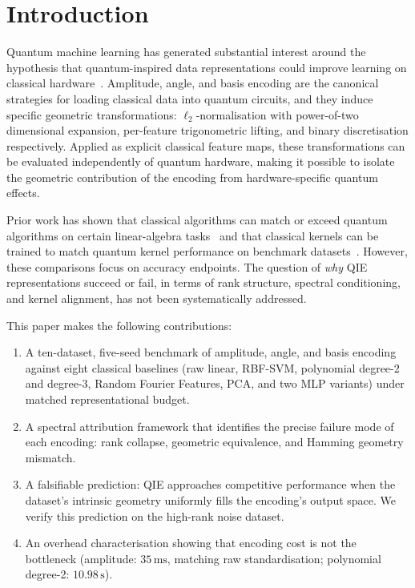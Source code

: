 \section{Introduction}
\label{sec:intro}

Quantum machine learning has generated substantial interest around the
hypothesis that quantum-inspired data representations could improve learning
on classical hardware~\citep{havlicek2019,schuld2019}.
Amplitude, angle, and basis encoding are the canonical strategies for loading
classical data into quantum circuits, and they induce specific geometric
transformations: $\ell_2$-normalisation with power-of-two dimensional
expansion, per-feature trigonometric lifting, and binary discretisation
respectively.
Applied as explicit classical feature maps, these transformations can be
evaluated independently of quantum hardware, making it possible to isolate the
geometric contribution of the encoding from hardware-specific quantum effects.

Prior work has shown that classical algorithms can match or exceed quantum
algorithms on certain linear-algebra tasks~\citep{tang2019} and that classical
kernels can be trained to match quantum kernel performance on benchmark
datasets~\citep{kubler2021,huang2021}.
However, these comparisons focus on accuracy endpoints.
The question of \emph{why} QIE representations succeed or fail, in terms of
rank structure, spectral conditioning, and kernel alignment, has not been
systematically addressed.

This paper makes the following contributions:
\begin{enumerate}
  \item A ten-dataset, five-seed benchmark of amplitude, angle, and basis
        encoding against eight classical baselines (raw linear, RBF-SVM,
        polynomial degree-2 and degree-3, Random Fourier Features, PCA,
        and two MLP variants) under matched representational budget.
  \item A spectral attribution framework that identifies the precise failure
        mode of each encoding: rank collapse, geometric equivalence, and
        Hamming geometry mismatch.
  \item A falsifiable prediction: QIE approaches competitive performance when
        the dataset's intrinsic geometry uniformly fills the encoding's output
        space.  We verify this prediction on the high-rank noise dataset.
  \item An overhead characterisation showing that encoding cost is not the
        bottleneck (amplitude: $35\,\mathrm{ms}$, matching raw standardisation;
        polynomial degree-2: $10.98\,\mathrm{s}$).
\end{enumerate}

